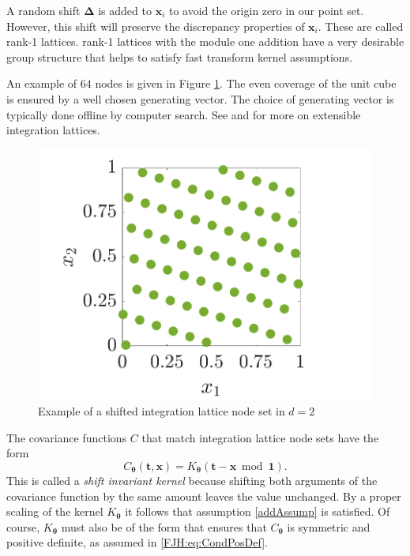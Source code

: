 \documentclass{iitthesis}          %
\newcommand{\bm}[1]{\boldsymbol{#1}}
\newcommand{\vDelta}{{\boldsymbol{\Delta}}}
\newcommand{\vtheta}{{\bm{\theta}}}
\newcommand{\vt}{\bm{t}}
\newcommand{\vx}{\bm{x}}
\newcommand{\vone}{\bm{1}}
\begin{document}
A random shift  $\vDelta$ is added to $\vx_{i}$ to avoid the origin zero in our point set. However, this shift will preserve the discrepancy properties of $\vx_{i}$. These are called rank-1 lattices.
rank-1 lattices with the module one addition have a very desirable group structure that helps to satisfy fast transform kernel assumptions.


An example of $64$ nodes is given in Figure  \ref{latticefig}.  The even coverage of the unit cube is ensured by a well chosen generating vector.  The choice of generating vector is typically done offline by computer search.  See \cite{DicEtal14a} and \cite{HicNie03a} for more on extensible integration lattices.
\begin{figure}[htp]
	\centering
	\includegraphics[width=0.7\linewidth]{ShiftedLatticePoints}
	\caption{Example of a shifted integration lattice node set  in $d=2$ \label{latticefig} }
\end{figure}

\label{sec:shift_invar_kern}

The covariance functions $C$ that match integration lattice node sets have the form
\begin{equation} \label{eq:shInv}
C_{\vtheta}(\vt,\vx) = K_{\vtheta}(\vt - \vx \bmod \vone).
\end{equation}
This is called a \emph{shift invariant kernel} because shifting both arguments of the covariance function by the same amount leaves the value unchanged.   By a proper scaling of the kernel $K_{\vtheta}$ it follows that assumption \eqref{addAssump} is satisfied. Of course, $K_{\vtheta}$ must also be of the form that ensures that $C_{\vtheta}$ is symmetric and positive definite, as assumed in \eqref{FJH:eq:CondPosDef}. 
\end{document}
